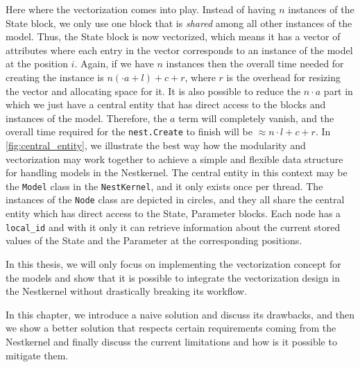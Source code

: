 Here where the vectorization comes into play. Instead of having $n$ instances of the State block, we only use one block that is \emph{shared} among all other instances of the model. Thus, the State block is now vectorized, which means it has a vector of attributes where each entry in the vector corresponds to an instance of the model at the position $i$. Again, if we have $n$ instances then the overall time needed for creating the instance is $n (\cdot a + l) + c + r $, where $r$ is the overhead for resizing the vector and allocating space for it. It is also possible to reduce the $n \cdot a$ part in which we just have a central entity that has direct access to the blocks and instances of the model. Therefore, the $a$ term will completely vanish, and the overall time required for the \texttt{nest.Create} to finish will be  $ \approx n \cdot l + c + r $. In \autoref{fig:central_entity}, we illustrate the best way how the modularity and vectorization may work together to achieve a simple and flexible data structure for handling models in the Nestkernel. The central entity in this context may be the \texttt{Model} class in the \texttt{NestKernel}, and it only exists once per thread. The instances of the \texttt{Node} class are depicted in circles, and they all share the central entity which has direct access to the State, Parameter blocks. Each node has a \texttt{local\_id} and with it only it can retrieve information about the current stored values of the State and the Parameter at the corresponding positions.
 
In this thesis, we will only focus on implementing the vectorization concept for the models and show that it is possible to integrate the vectorization design in the Nestkernel without drastically breaking its workflow.

In this chapter, we introduce a naive solution and discuss its drawbacks, and then we show a better solution that respects certain requirements coming from the Nestkernel and finally discuss the current limitations and how is it possible to mitigate them.
 
